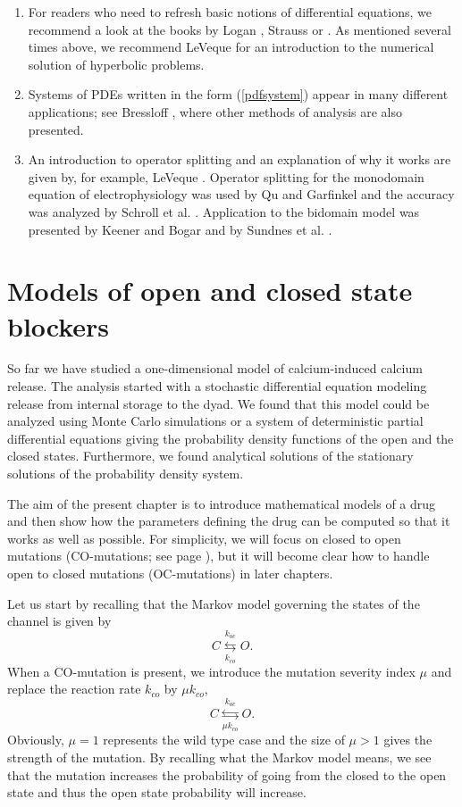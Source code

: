 \begin{enumerate}
\item For readers who need to refresh basic notions of differential equations, we recommend a look at the books by Logan \cite{Logan2014}, Strauss \cite{Strauss2008} or \cite{Tveito2005,Tveito2010}. As mentioned several times above, we recommend LeVeque \cite{LeVeque2002} for an introduction to the  numerical solution of hyperbolic problems.
\item Systems of PDEs written in the form (\ref{pdfsystem}) appear in many different applications; see Bressloff \cite{Bressloff2014}, where other methods of analysis are also presented.
\item An introduction to operator splitting and an explanation of why it works are given by, for example,  LeVeque \cite{LeVeque2002}. Operator splitting for the monodomain equation of electrophysiology  was used by Qu and Garfinkel \cite{Qu1999} and the accuracy was analyzed by Schroll et al. \cite{Schroll2007}. Application to the bidomain model was presented by Keener and Bogar \cite{Keener1998} and by  Sundnes et al. \cite{Sundnes2005}.
\end{enumerate}


\chapter{Models of open and closed state blockers}

So far we have studied a one-dimensional model of calcium-induced calcium release. The analysis started with a stochastic differential equation modeling release from internal storage to the dyad. We found that this model could be analyzed using Monte Carlo simulations or a system of deterministic partial differential equations giving the probability density functions of the open and the closed states. Furthermore, we found analytical solutions of the stationary solutions of the probability density system. 

The aim of the present chapter is to introduce mathematical models of a drug and then show how the parameters defining the drug can be computed so that it works as well as possible. 
For simplicity, we will focus on closed to open mutations (CO-mutations; see page \pageref{com}), but it will become clear how to handle open to closed mutations (OC-mutations) in later chapters.


Let us start by recalling that the Markov model governing the states of the channel is given by
\begin{equation}
C\underset{k_{co}}{\overset{k_{oc}}{\leftrightarrows}}O. \label{Markov22}
\end{equation}
When a CO-mutation is present, we introduce the mutation severity index $\mu$ and replace the reaction rate $k_{co}$ by $\mu k_{co}$,
\begin{equation}
C\underset{\mu k_{co}}{\overset{k_{oc}}{\leftrightarrows}}O. \label{Markov23}
\end{equation}
Obviously, $\mu=1$ represents the wild type case and the size of $\mu >1$ gives the strength of the mutation. By recalling what the Markov model means, we see that the mutation increases the probability of going from the closed to the open state and thus the open state probability will increase.


